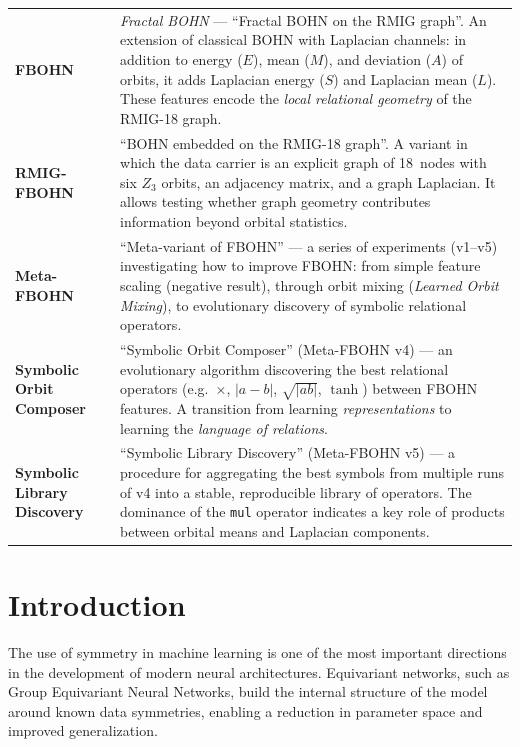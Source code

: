 \documentclass[11pt,a4paper]{report}
\begin{document}
\begin{center}
\begin{tabular}{lp{10cm}}
\textbf{FBOHN} &
\emph{Fractal BOHN} --- ``Fractal BOHN on the RMIG graph''. An extension of classical BOHN with Laplacian channels: in addition to energy ($E$), mean ($M$), and deviation ($A$) of orbits, it adds Laplacian energy ($S$) and Laplacian mean ($L$). These features encode the \emph{local relational geometry} of the RMIG-18 graph.\\

\textbf{RMIG-FBOHN} &
``BOHN embedded on the RMIG-18 graph''. A variant in which the data carrier is an explicit graph of 18~nodes with six $Z_3$ orbits, an adjacency matrix, and a graph Laplacian. It allows testing whether graph geometry contributes information beyond orbital statistics. \\

\textbf{Meta-FBOHN} &
``Meta-variant of FBOHN'' --- a series of experiments (v1--v5) investigating how to improve FBOHN: from simple feature scaling (negative result), through orbit mixing (\emph{Learned Orbit Mixing}), to evolutionary discovery of symbolic relational operators. \\

\textbf{Symbolic Orbit Composer} &
``Symbolic Orbit Composer'' (Meta-FBOHN v4) --- an evolutionary algorithm discovering the best relational operators (e.g.~$\times$, $|a{-}b|$, $\sqrt{|ab|}$, $\tanh$) between FBOHN features. A transition from learning \emph{representations} to learning the \emph{language of relations}. \\

\textbf{Symbolic Library Discovery} &
``Symbolic Library Discovery'' (Meta-FBOHN v5) --- a procedure for aggregating the best symbols from multiple runs of v4 into a stable, reproducible library of operators. The dominance of the \texttt{mul} operator indicates a key role of products between orbital means and Laplacian components. \\

\bottomrule
\end{tabular}
\end{center}

\newpage

\chapter{Introduction}

The use of symmetry in machine learning is one of the most important directions in the development of modern neural architectures. Equivariant networks, such as Group Equivariant Neural Networks, build the internal structure of the model around known data symmetries, enabling a reduction in parameter space and improved generalization.
\end{document}
